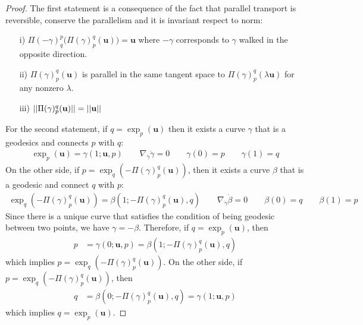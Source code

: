 \begin{proof}
	The first statement is a consequence of the fact that parallel transport is reversible, conserve the parallelism and it is invariant respect to norm: 
	\begin{enumerate}
		\item[i)] $\Pi(-\gamma)_{q}^{p}\Big(\Pi(\gamma)_{p}^{q}(\mathbf{u})\Big) = \mathbf{u}$ where $-\gamma$ corresponds to $\gamma$ walked in the opposite direction.
		\item[ii)] $\Pi(\gamma)_{p}^{q}(\mathbf{u})$ is parallel in the same tangent space to $\Pi(\gamma)_{p}^{q}(\lambda \mathbf{u})$ for any nonzero $\lambda$.
		\item[iii)] $\vert\lvert \Pi(\gamma)_{p}^{q}(\mathbf{u}) \rvert\vert = \vert\lvert \mathbf{u} \rvert\vert$ 
	\end{enumerate}
	For the second statement, if $q = \exp_{p}(\mathbf{u})$ then it exists a curve $\gamma$ that is a geodesics and connects $p$ with $q$:
	\begin{align*}
		\exp_{p}(\mathbf{u}) = \gamma(1;\mathbf{u}, p) 
		\qquad 
		\nabla_{\dot{\gamma}}\dot{\gamma}=0
		\qquad
		\gamma(0) = p
		\qquad
		\gamma(1) = q
	\end{align*}
	On the other side, if $p = \exp_{q}(-\Pi(\gamma)_{p}^{q}(\mathbf{u}))$, then it exists a curve $\beta$ that is a geodesic and connect $q$ with $p$: 
	\begin{align*}
		\exp_{q}(-\Pi(\gamma)_{p}^{q}(\mathbf{u}))= \beta(1;-\Pi(\gamma)_{p}^{q}(\mathbf{u}), q) 
		\qquad 
		\nabla_{\dot{\gamma}}\dot{\beta}=0
		\qquad
		\beta(0) = q
		\qquad
		\beta(1) = p
	\end{align*}
	Since there is a unique curve that satisfies the condition of being geodesic between two points, we have $\gamma = -\beta$. Therefore, if $q = \exp_{p}(\mathbf{u})$, then
	\begin{align*}
		p &=  \gamma(0;\mathbf{u}, p) = \beta( 1;-\Pi(\gamma)_{p}^{q}(\mathbf{u}), q) 
	\end{align*}
	 which implies $p = \exp_{q}(-\Pi(\gamma)_{p}^{q}(\mathbf{u}))$. On the other side, if $p = \exp_{q}(-\Pi(\gamma)_{p}^{q}(\mathbf{u}))$, then 
	\begin{align*}
	q &= \beta( 0;-\Pi(\gamma)_{p}^{q}(\mathbf{u}), q)  = \gamma(1;\mathbf{u}, p) 
	\end{align*}
	which implies $q = \exp_{p}(\mathbf{u})$.
\end{proof}

